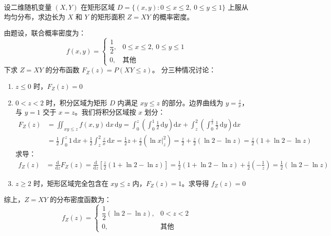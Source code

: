 \documentclass[lang=cn,11pt]{elegantbook}
\begin{document}
\begin{exercise} \label{exer:3-8c}
设二维随机变量 $(X,Y)$ 在矩形区域 $D = \{(x,y) : 0 \leqslant x \leqslant 2,\ 0 \leqslant y \leqslant 1\}$ 上服从均匀分布，求边长为 $X$ 和 $Y$ 的矩形面积 $Z = XY$ 的概率密度。
\end{exercise}

\begin{solution}
由题设，联合概率密度为：
\[
f(x,y) = \begin{cases} \dfrac{1}{2}, & 0 \leqslant x \leqslant 2,\ 0 \leqslant y \leqslant 1 \\ 0, & \text{其他} \end{cases}
\]
下求 $Z=XY$ 的分布函数 $F_Z(z) = P(XY \leqslant z)$。
分三种情况讨论：
\begin{enumerate}
    \item $z \leqslant 0$ 时，$F_Z(z) = 0$
    \item $0 < z < 2$ 时，积分区域为矩形 $D$ 内满足 $xy \leqslant z$ 的部分。边界曲线为 $y = \frac{z}{x}$，与 $y=1$ 交于 $x=z$。我们将积分区域按 $x$ 划分：
\begin{align*}
    F_Z(z) &= \iint_{xy \leqslant z} f(x,y) \,\mathrm{d}x\,\mathrm{d}y = \int_0^z \left( \int_0^1 \frac{1}{2} \,\mathrm{d}y \right) \mathrm{d}x + \int_z^2 \left( \int_0^{\frac{z}{x}} \frac{1}{2} \,\mathrm{d}y \right) \mathrm{d}x \\
    &= \frac{1}{2} \int_0^z 1 \,\mathrm{d}x + \frac{1}{2} \int_z^2 \frac{z}{x} \,\mathrm{d}x = \frac{1}{2}z + \frac{z}{2} \left( \left. \ln x \right|_z^2 \right) = \frac{z}{2} + \frac{z}{2} (\ln 2 - \ln z) = \frac{z}{2}(1 + \ln 2 - \ln z)
\end{align*}
求导：
\begin{align*}
    f_Z(z) &= \frac{\mathrm{d}}{\mathrm{d}z} F_Z(z) = \frac{\mathrm{d}}{\mathrm{d}z} \left[ \frac{z}{2}(1 + \ln 2 - \ln z) \right] = \frac{1}{2}(1 + \ln 2 - \ln z) + \frac{z}{2} \left( -\frac{1}{z} \right) = \frac{1}{2}(\ln 2 - \ln z)
\end{align*}
    \item $z \geqslant 2$ 时，矩形区域完全包含在 $xy \leqslant z$ 内，$F_Z(z) = 1$。求导得 $f_Z(z) = 0$
\end{enumerate}
综上，$Z = XY$ 的分布密度函数为：
\[
f_Z(z) = \begin{cases} \dfrac{1}{2}(\ln 2 - \ln z), & 0 < z < 2 \\ 0, & \text{其他} \end{cases}
\]
\end{solution}
\end{document}

